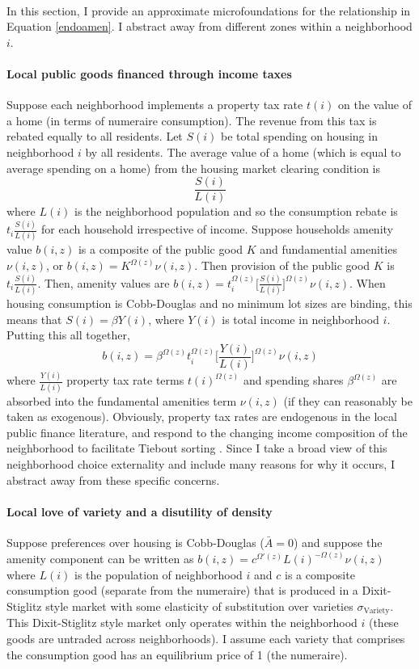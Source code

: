\documentclass[12pt]{article}
\begin{document}
	\paragraph*{}
	In this section, I provide an approximate microfoundations for the relationship in Equation \eqref{endoamen}. I abstract away from different zones within a neighborhood $i$.

	\paragraph*{Local public goods financed through income taxes} Suppose each neighborhood implements a property tax rate $t(i)$ on the value of a home (in terms of numeraire consumption). The revenue from this tax is rebated equally to all residents. Let $S(i)$ be total spending on housing in neighborhood $i$ by all residents. The average value of a home (which is equal to average spending on a home) from the housing market clearing condition is $$\frac{S(i)}{L(i)}$$ where $L(i)$ is the neighborhood population and so the consumption rebate is $t_{i}\frac{S(i)}{L(i)}$ for each household irrespective of income. Suppose households amenity value $b(i, z)$ is a composite of the public good $K$ and fundamential amenities $\nu(i, z)$, or $b(i, z) = K^{\Omega(z)}\nu(i, z)$. Then provision of the public good $K$ is $t_{i}\frac{S(i)}{L(i)}$. Then, amenity values are $b(i, z) = t_{i}^{\Omega(z)}\bigg[\frac{S(i)}{L(i)}\bigg]^{\Omega(z)}\nu(i, z)$. When housing consumption is Cobb-Douglas and no minimum lot sizes are binding, this means that $S(i) = \beta Y(i)$, where $Y(i)$ is total income in neighborhood $i$. Putting this all together, $$b(i, z) = \beta^{\Omega(z)}t_{i}^{\Omega(z)}\bigg[\frac{Y(i)}{L(i)}\bigg]^{\Omega(z)}\nu(i, z)$$ where $\frac{Y(i)}{L(i)}$ property tax rate terms $t(i)^{\Omega(z)}$ and spending shares $\beta^{\Omega(z)}$ are absorbed into the fundamental amenities term $\nu(i, z)$ (if they can reasonably be taken as exogenous). Obviously, property tax rates are endogenous in the local public finance literature, and respond to the changing income composition of the neighborhood to facilitate Tiebout sorting \citep{calabresetal, ineffTiebout}. Since I take a broad view of this neighborhood choice externality and include many reasons for why it occurs, I abstract away from these specific concerns. 
	
	\paragraph*{Local love of variety and a disutility of density} Suppose preferences over housing is Cobb-Douglas ($\bar{A} = 0$) and suppose the amenity component can be written as $b(i, z) = c^{\Omega'(z)}L(i)^{-\Omega(z)}\nu(i, z)$ where $L(i)$ is the population of neighborhood $i$ and $c$ is a composite consumption good (separate from the numeraire) that is produced in a Dixit-Stiglitz style market with some elasticity of substitution over varieties $\sigma_{\text{Variety}}$. This Dixit-Stiglitz style market only operates within the neighborhood $i$ (these goods are untraded across neighborhoods). I assume each variety that comprises the consumption good has an equilibrium price of 1 (the numeraire).
	
\end{document}
